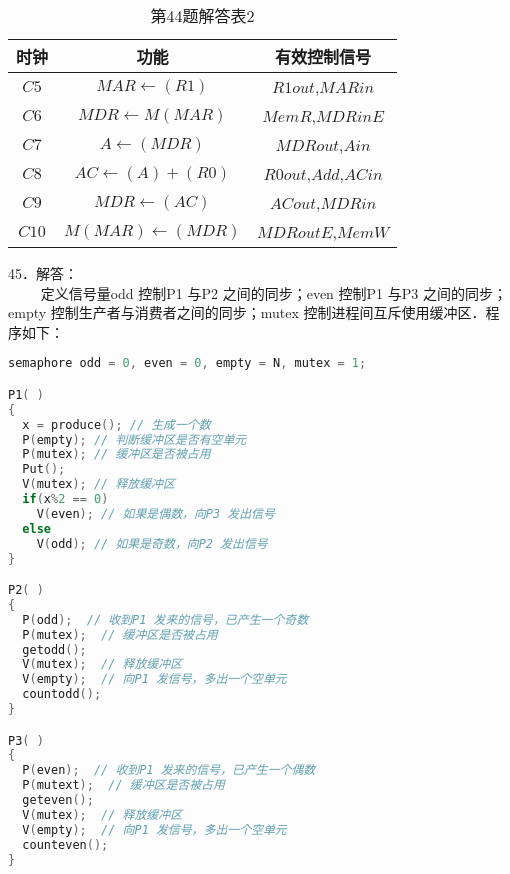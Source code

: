 \begin{table}[ht]
\centering
\caption{第44题解答表2}\label{CSN09_tab7}
\begin{tabular}{|c|c|c|}
\hline
时钟 & 功能 & 有效控制信号 \\
\hline
$C5$ & $MAR\leftarrow(R1)$ & $R1out$,$MARin$ \\
\hline
$C6$ & $MDR\leftarrow M(MAR)$ & $MemR$,$MDRinE$ \\
\hline
$C7$ & $A\leftarrow(MDR)$ & $MDRout$,$Ain$ \\
\hline
$C8$ & $AC\leftarrow(A)+(R0)$ & $R0out$,$Add$,$ACin$ \\
\hline
$C9$ & $MDR\leftarrow(AC)$ & $ACout$,$MDRin$ \\
\hline
$C10$ & $M(MAR)\leftarrow(MDR)$ & $MDRoutE$,$MemW$ \\
\hline
\end{tabular}
\end{table}

45．解答： \\
$\qquad$ 定义信号量odd 控制P1 与P2 之间的同步；even 控制P1 与P3 之间的同步；empty 控制生产者与消费者之间的同步；mutex 控制进程间互斥使用缓冲区．程序如下：
\begin{lstlisting}[language=cpp]
semaphore odd = 0, even = 0, empty = N, mutex = 1;

P1( )
{
  x = produce(); // 生成一个数
  P(empty); // 判断缓冲区是否有空单元
  P(mutex); // 缓冲区是否被占用
  Put();
  V(mutex); // 释放缓冲区
  if(x%2 == 0)
    V(even); // 如果是偶数，向P3 发出信号
  else
    V(odd); // 如果是奇数，向P2 发出信号
}

P2( )
{
  P(odd);  // 收到P1 发来的信号，已产生一个奇数
  P(mutex);  // 缓冲区是否被占用
  getodd();
  V(mutex);  // 释放缓冲区
  V(empty);  // 向P1 发信号，多出一个空单元
  countodd();
}

P3( )
{
  P(even);  // 收到P1 发来的信号，已产生一个偶数
  P(mutext);  // 缓冲区是否被占用
  geteven();
  V(mutex);  // 释放缓冲区
  V(empty);  // 向P1 发信号，多出一个空单元
  counteven();
}
\end{lstlisting}